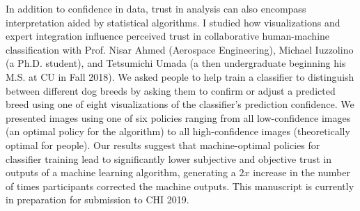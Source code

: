 \documentclass[11pt]{article}
\begin{document}
In addition to confidence in data, trust in analysis can also encompass interpretation aided by statistical algorithms. I studied how visualizations and expert integration influence perceived trust in collaborative human-machine classification with Prof. Nisar Ahmed (Aerospace Engineering), Michael Iuzzolino (a Ph.D. student), and Tetsumichi Umada (a then undergraduate beginning his M.S. at CU in Fall 2018). We asked people to help train a classifier to distinguish between different dog breeds by asking them to confirm or adjust a predicted breed using one of eight visualizations of the classifier's prediction confidence. We presented 
images using one of six policies ranging from all low-confidence images (an optimal policy for the algorithm) to all high-confidence images  (theoretically optimal for people). Our results suggest that machine-optimal policies for classifier training lead to significantly lower subjective and objective trust in outputs of a machine learning algorithm, generating a $2x$ increase in the number of times participants corrected the machine outputs. This manuscript is currently in preparation for submission to CHI 2019. 


\end{document}
